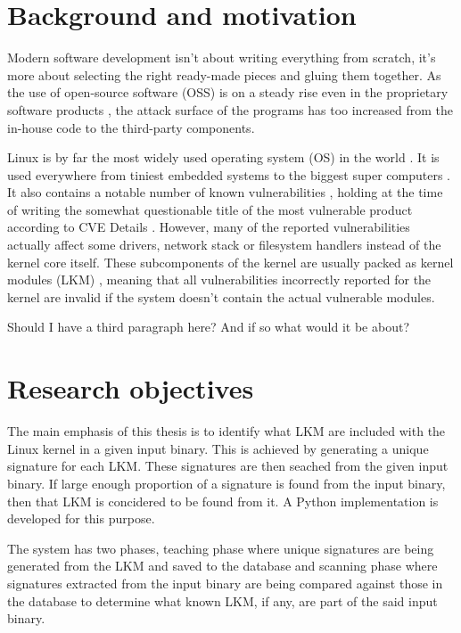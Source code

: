 
\section{Background and motivation}

Modern software development isn't about writing everything from scratch, it's more about selecting
the right ready-made pieces and gluing them together. As the use of open-source software (OSS) is
on a steady rise even in the proprietary software products \cite{deshpande2008total}, the attack
surface of the programs has too increased from the in-house code to the third-party components.

Linux is by far the most widely used operating system (OS) in the world \cite{blah}. It is used
everywhere from tiniest embedded systems \cite{picotux} to the biggest super computers
\cite{top500linuxshare}. It also contains a notable number of known vulnerabilities
\cite{cvedetailslinuxkernel}, holding at the time of writing the somewhat questionable title of the
most vulnerable product according to CVE Details \cite{cvedetailstop50}. However, many of the
reported vulnerabilities actually affect some drivers, network stack or filesystem handlers instead
of the kernel core itself. These subcomponents of the kernel are usually packed as kernel modules
(LKM) \cite{whatislkm}, meaning that all vulnerabilities incorrectly reported for the kernel are
invalid if the system doesn't contain the actual vulnerable modules.

Should I have a third paragraph here? And if so what would it be about?

\section{Research objectives}

The main emphasis of this thesis is to identify what LKM are included with the Linux kernel in a
given input binary. This is achieved by generating a unique signature for each LKM. These
signatures are then seached from the given input binary. If large enough proportion of a signature
is found from the input binary, then that LKM is concidered to be found from it. A Python
implementation is developed for this purpose.

The system has two phases, teaching phase where unique signatures are being generated from the LKM
and saved to the database and scanning phase where signatures extracted from the input binary are
being compared against those in the database to determine what known LKM, if any, are part of the
said input binary.


